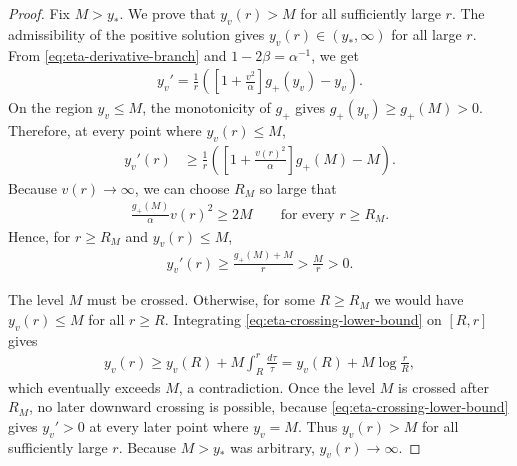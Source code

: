 \documentclass{amsart}
\theoremstyle{plain}
\theoremstyle{mainintrothm}
\theoremstyle{definition}
\begin{document}
	\begin{proof}
		Fix $M>y_*$.  We prove that $y_v(r)>M$ for all
		sufficiently large $r$.  The admissibility of the positive solution gives
		$y_v(r)\in(y_*,\infty)$ for all large $r$.  From
		\eqref{eq:eta-derivative-branch} and $1-2\beta=\alpha^{-1}$, we get
		\begin{align*}
			y_v'
			=
			\frac{1}{r}
			\left(
			\left[1+\frac{v^2}{\alpha}\right]g_+(y_v)
			-
			y_v
			\right).
		\end{align*}
		On the region $y_v\le M$, the monotonicity of $g_+$ gives
		$g_+(y_v)\ge g_+(M)>0$.  Therefore, at every point where
		$y_v(r)\le M$,
		\begin{align*}
			y_v'(r)
			&\ge
			\frac{1}{r}
			\left(
			\left[1+\frac{v(r)^2}{\alpha}\right]g_+(M)
			-
			M
			\right).
		\end{align*}
		Because $v(r)\to\infty$, we can choose $R_M$ so large that
		\begin{align*}
			\frac{g_+(M)}{\alpha}v(r)^2
			\ge
			2M
			\qquad
			\text{for every }r\ge R_M.
		\end{align*}
		Hence, for $r\ge R_M$ and $y_v(r)\le M$,
		\begin{align}
			\label{eq:eta-crossing-lower-bound}
			y_v'(r)
			\ge
			\frac{g_+(M)+M}{r}
			>
			\frac{M}{r}
			>
			0.
		\end{align}
				
		The level $M$ must be crossed.  Otherwise, for some $R\ge R_M$ we would have
		$y_v(r)\le M$ for all $r\ge R$.  Integrating
		\eqref{eq:eta-crossing-lower-bound} on $[R,r]$ gives
		\begin{align*}
			y_v(r)
			\ge
			y_v(R)
			+
			M\int_R^r\frac{d\tau}{\tau}
			=
			y_v(R)
			+
			M\log\frac{r}{R},
		\end{align*}
		which eventually exceeds $M$, a contradiction.  Once the level $M$ is
		crossed after $R_M$, no later downward crossing is possible, because
		\eqref{eq:eta-crossing-lower-bound} gives $y_v'>0$ at every later point
		where $y_v=M$.  Thus $y_v(r)>M$ for all sufficiently large $r$.
		Because $M>y_*$ was arbitrary, $y_v(r)\to\infty$.
	\end{proof}
	
\end{document}
